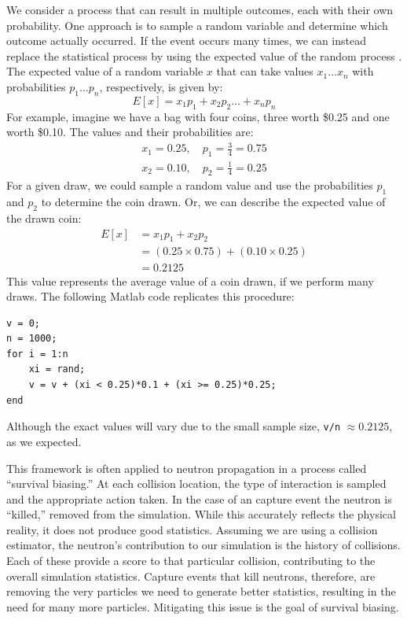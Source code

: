 We consider a process that can result in multiple outcomes, each with
their own probability. One approach is to sample a random variable and
determine which outcome actually occurred. If the event occurs many
times, we can instead replace the
statistical process by using the expected value of the random process
\cite{lux1991}. The expected value of a random variable $x$ that can
take values ${x_1 \ldots x_n}$ with  probabilities ${p_1 \ldots p_n}$, respectively,
is given by:
\begin{equation}
  \label{eq:expval}
  E[x] = x_1p_1 + x_2p_2 \ldots + x_{n}p_n
\end{equation}
For example, imagine we have a bag with four coins, three worth \$0.25 and
one worth \$0.10. The values and their probabilities are:
\begin{align*}
  x_1 = 0.25, \quad p_1 = \frac{3}{4} = 0.75 \\
  x_2 = 0.10, \quad p_2 = \frac{1}{4} = 0.25
\end{align*}
For a given draw, we could sample a random value and use the
probabilities $p_1$ and $p_2$ to determine the coin drawn. Or, we can
describe the expected value of the drawn coin:
\begin{align*}
  E[x] &= x_1p_1 + x_2p_2 \\
  &= (0.25 \times 0.75) + (0.10 \times 0.25) \\
  &= 0.2125
\end{align*}
This value represents the average value of a coin drawn, if we perform
many draws. The following Matlab code replicates this procedure:
\begin{lstlisting}
v = 0;
n = 1000;
for i = 1:n
    xi = rand;  
    v = v + (xi < 0.25)*0.1 + (xi >= 0.25)*0.25;
end
\end{lstlisting}
Although the exact values will vary due to the small sample size, \verb|v/n|
$\approx 0.2125$, as we expected.

This framework is often applied to neutron propagation in a process
called ``survival biasing.'' At each collision location, the type of
interaction is sampled and the appropriate action taken. In the case
of an capture event the neutron is ``killed,'' removed from the
simulation. While this accurately reflects the physical reality, it
does not produce good statistics. Assuming we are using a collision
estimator, the neutron's contribution to our simulation is the history
of collisions. Each of these provide a score to that particular
collision, contributing to the overall simulation
statistics. Capture events that kill neutrons, therefore, are
removing the very particles we need to generate better statistics,
resulting in the need for many more particles. Mitigating this issue
is the goal of survival biasing.

